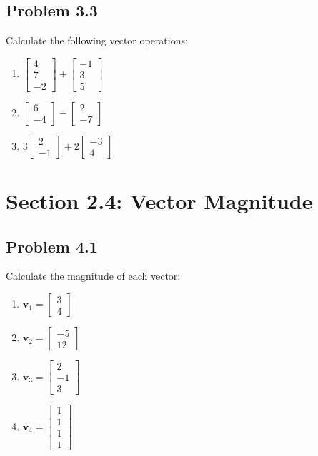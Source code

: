 \documentclass{article}
\begin{document}
\subsection{Problem 3.3}
Calculate the following vector operations:
\begin{enumerate}
\item $\begin{bmatrix} 4 \\ 7 \\ -2 \end{bmatrix} + \begin{bmatrix} -1 \\ 3 \\ 5 \end{bmatrix}$
\item $\begin{bmatrix} 6 \\ -4 \end{bmatrix} - \begin{bmatrix} 2 \\ -7 \end{bmatrix}$
\item $3\begin{bmatrix} 2 \\ -1 \end{bmatrix} + 2\begin{bmatrix} -3 \\ 4 \end{bmatrix}$
\end{enumerate}

\section{Section 2.4: Vector Magnitude}

\subsection{Problem 4.1}
Calculate the magnitude of each vector:
\begin{enumerate}
\item $\mathbf{v}_1 = \begin{bmatrix} 3 \\ 4 \end{bmatrix}$
\item $\mathbf{v}_2 = \begin{bmatrix} -5 \\ 12 \end{bmatrix}$
\item $\mathbf{v}_3 = \begin{bmatrix} 2 \\ -1 \\ 3 \end{bmatrix}$
\item $\mathbf{v}_4 = \begin{bmatrix} 1 \\ 1 \\ 1 \\ 1 \end{bmatrix}$
\end{enumerate}
\end{document}
